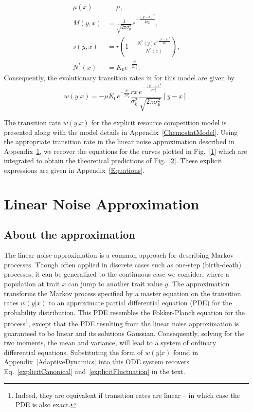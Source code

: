 \begin{align}
	\mu(x) &= \mu, \nonumber \\
	M(y,x) &= \tfrac{1}{\sqrt{2\pi\sigma_{\mu}^2}}e^{-\frac{(y-x)^2}{2\sigma_{\mu}^2}}, \nonumber \\ 
	s(y,x) &= r\left(1-\frac{N^{\ast}(y)  e^{-\frac{(x-y)^2}{2\sigma_c^2}}  }{N^{\ast}(x)}\right), \nonumber \\
	N^{\ast}(x) &= K_0e^{-\frac{x^2}{2\sigma_k^2}}. \label{explicitS}
\end{align}
Consequently, the evolutionary transition rates in for this model are given by
\begin{equation}
	w(y|x) = -\mu  K_0e^{-\frac{x^2}{2\sigma_k^2}} \frac{rx}{\sigma_k^2} \frac{e^{-\frac{(y-x)^2}{2\sigma_{\mu}^2}} }{\sqrt{2\pi\sigma_{\mu}^2}}[y-x].
	\label{example_w}
\end{equation}
 
The transition rate $w(y|x)$ for the explicit resource competition model is presented along with the model details in Appendix~\ref{ChemostatModel}.  Using the appropriate transition rate in the linear noise approximation described in Appendix~\ref{LinearNoiseApproximation}, we recover the equations for the curves plotted in Fig.~\ref{1} which are integrated to obtain the theoretical predictions of Fig.~\ref{2}.  These explicit expressions are given in Appendix~\ref{Equations}. 
 
\section{Linear Noise Approximation}\label{LinearNoiseApproximation}
\subsection{About the approximation}
The linear noise approximation is a common approach for describing Markov processes.  Though often applied in discrete cases such as one-step (birth-death) processes, it can be generalized to the continuous case we consider, where a population at trait $x$ can jump to another trait value $y$. The approximation transforms the Markov process specified by a master equation on the transition rates $w(y|x)$ to an approximate partial differential equation (PDE) for the probability distribution.  This PDE resembles the Fokker-Planck equation for the process\footnote{Indeed, they are equivalent if transition rates are linear -- in which case the PDE is also exact.}, except that the PDE resulting from the linear noise approximation is guaranteed to be linear and its solutions Gaussian.  Consequently, solving for the two moments, the mean and variance, will lead to a system of ordinary differential equations.  Substituting the form of $w(y|x)$ found in Appendix~\ref{AdaptiveDynamics} into this ODE system recovers Eq.~\eqref{explicitCanonical} and~\eqref{explicitFluctuation} in the text.   
 
